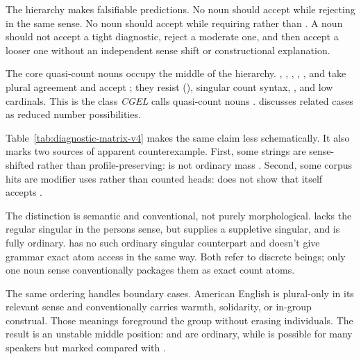 \documentclass[12pt,a4paper]{article}
\begin{document}




The hierarchy makes falsifiable predictions. No noun should accept  while rejecting  in the same sense. No noun should accept  while requiring  rather than . A noun should not accept a tight diagnostic, reject a moderate one, and then accept a looser one without an independent sense shift or constructional explanation.

The core quasi-count nouns occupy the middle of the hierarchy. , , , , , and  take plural agreement and accept ; they resist (), singular count syntax, , and low cardinals. This is the class \emph{CGEL} calls quasi-count nouns \citep[p.~345]{huddleston2002}. \textcite{corbett2019} discusses related cases as reduced number possibilities.



Table~\ref{tab:diagnostic-matrix-v4} makes the same claim less schematically. It also marks two sources of apparent counterexample. First, some strings are sense-shifted rather than profile-preserving:  is not ordinary mass . Second, some corpus hits are modifier uses rather than counted heads:  does not show that  itself accepts .

The distinction is semantic and conventional, not purely morphological.  lacks the regular singular  in the persons sense, but  supplies a suppletive singular, and  is fully ordinary.  has no such ordinary singular counterpart and doesn't give grammar exact atom access in the same way. Both refer to discrete beings; only one noun sense conventionally packages them as exact count atoms.

The same ordering handles boundary cases. American English  is plural-only in its relevant sense and conventionally carries warmth, solidarity, or in-group construal. Those meanings foreground the group without erasing individuals. The result is an unstable middle position:  and  are ordinary, while  is possible for many speakers but marked compared with .
\end{document}
